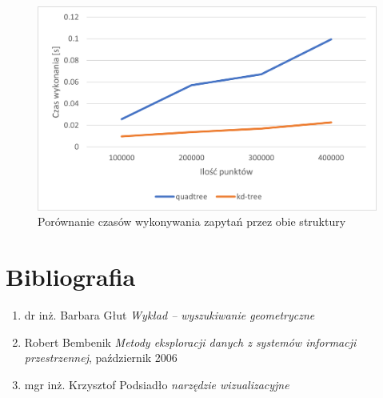 \documentclass{article}
\begin{document}
\begin{figure}[H]
    \centering
    \includegraphics[width=\linewidth]{query_chart.png}
    \caption{Porównanie czasów wykonywania zapytań przez obie struktury}
    \label{fig:query_chart}
\end{figure}

\section{Bibliografia}

\begin{enumerate}
    \item dr inż. Barbara Głut \textit{Wykład -- wyszukiwanie geometryczne}
    \item Robert Bembenik \textit{Metody eksploracji danych z systemów informacji przestrzennej}, październik 2006
    \item mgr inż. Krzysztof Podsiadło \textit{narzędzie wizualizacyjne}
\end{enumerate}
\end{document}
